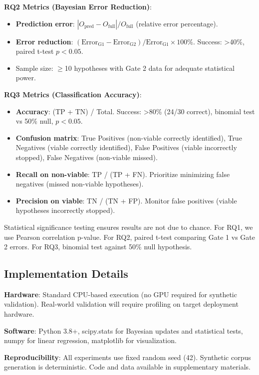 \textbf{RQ2 Metrics (Bayesian Error Reduction)}:
\begin{itemize}
\item \textbf{Prediction error}: $|O_{\text{pred}} - O_{\text{full}}| / O_{\text{full}}$ (relative error percentage).
\item \textbf{Error reduction}: $(\text{Error}_{\text{G1}} - \text{Error}_{\text{G2}}) / \text{Error}_{\text{G1}} \times 100\%$. Success: >40\%, paired t-test $p < 0.05$.
\item Sample size: $\geq$10 hypotheses with Gate 2 data for adequate statistical power.
\end{itemize}

\textbf{RQ3 Metrics (Classification Accuracy)}:
\begin{itemize}
\item \textbf{Accuracy}: (TP + TN) / Total. Success: >80\% (24/30 correct), binomial test vs 50\% null, $p < 0.05$.
\item \textbf{Confusion matrix}: True Positives (non-viable correctly identified), True Negatives (viable correctly identified), False Positives (viable incorrectly stopped), False Negatives (non-viable missed).
\item \textbf{Recall on non-viable}: TP / (TP + FN). Prioritize minimizing false negatives (missed non-viable hypotheses).
\item \textbf{Precision on viable}: TN / (TN + FP). Monitor false positives (viable hypotheses incorrectly stopped).
\end{itemize}

Statistical significance testing ensures results are not due to chance. For RQ1, we use Pearson correlation p-value. For RQ2, paired t-test comparing Gate 1 vs Gate 2 errors. For RQ3, binomial test against 50\% null hypothesis.

\subsection{Implementation Details}

\textbf{Hardware}: Standard CPU-based execution (no GPU required for synthetic validation). Real-world validation will require profiling on target deployment hardware.

\textbf{Software}: Python 3.8+, scipy.stats for Bayesian updates and statistical tests, numpy for linear regression, matplotlib for visualization.

\textbf{Reproducibility}: All experiments use fixed random seed (42). Synthetic corpus generation is deterministic. Code and data available in supplementary materials.

